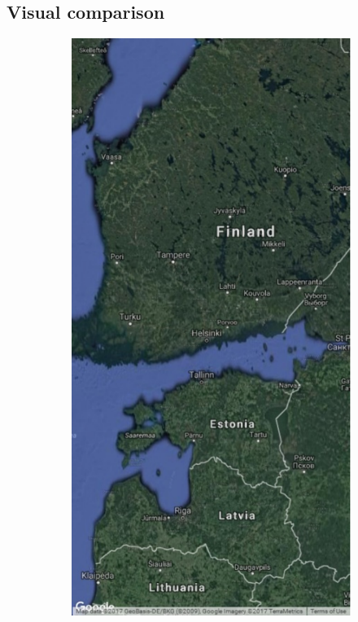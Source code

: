 \documentclass[a4paper,12pt]{scrbook}
\begin{document}
\subsection{Visual comparison}

\begin{figure}
  \centering
  \begin{subfigure}[t]{.23\textwidth}
    \includegraphics[width=\textwidth]{thesis-figures/figures-qgis/fulltile-google}

\end{subfigure}
\end{figure}
\end{document}
